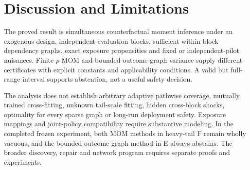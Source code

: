 \section{Discussion and Limitations}
\label{sec:conclusion}
The proved result is simultaneous counterfactual moment inference under an exogenous design, independent evaluation blocks, sufficient within-block dependency graphs, exact exposure propensities and fixed or independent-pilot nuisances. Finite-$p$ MOM and bounded-outcome graph variance supply different certificates with explicit constants and applicability conditions. A valid but full-range interval supports abstention, not a useful safety decision.

The analysis does not establish arbitrary adaptive pathwise coverage, mutually trained cross-fitting, unknown tail-scale fitting, hidden cross-block shocks, optimality for every sparse graph or long-run deployment safety. Exposure mappings and joint-policy compatibility require substantive modeling. In the completed frozen experiment, both MOM methods in heavy-tail F remain wholly vacuous, and the bounded-outcome graph method in E always abstains. The broader discovery, repair and network program requires separate proofs and experiments.
